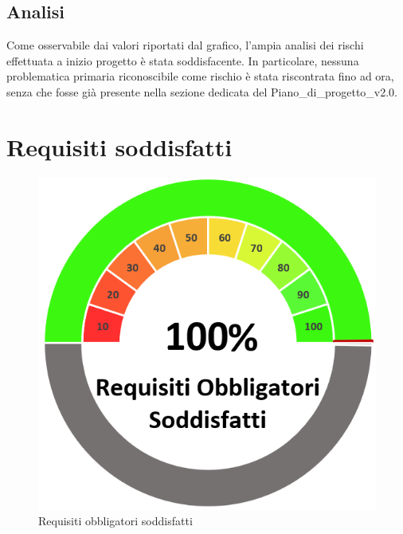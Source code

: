 \subsection{Analisi}
Come osservabile dai valori riportati dal grafico, l'ampia analisi dei rischi effettuata a inizio progetto è stata soddisfacente. In particolare, nessuna problematica primaria riconoscibile come rischio è stata riscontrata fino ad ora, senza che fosse già presente nella sezione dedicata del Piano\_di\_progetto\_v2.0.

\section{Requisiti soddisfatti}
\begin{figure}[H]
    \centering
    \begin{minipage}[b]{0.32\textwidth}
        \centering
        \includegraphics[width=\textwidth]{ReqObbSodd.png}
        \caption{Requisiti obbligatori soddisfatti}
        \label{reqobbsodd}
    \end{minipage}
    \hfill
    \begin{minipage}[b]{0.32\textwidth}
        \centering

\end{minipage}
\end{figure}
